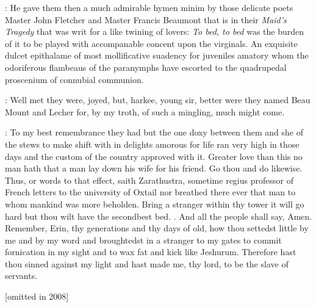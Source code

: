 \documentclass[12pt]{article}
\begin{document}
: He gave them then a much admirable hymen minim by those
delicate poets Master John Fletcher and Master Francis Beaumont that is
in their \emph{Maid's Tragedy} that was writ for a like twining of lovers:
\emph{To bed, to bed} was the burden of it to be played with
accompanable concent upon the virginals.
An exquisite dulcet epithalame of most mollificative suadency for
juveniles amatory whom the odoriferous flambeaus of the paranymphs have
escorted to the quadrupedal proscenium of connubial communion.

\Dx: Well met they were, joyed, but, harkee,
young sir, better were they named Beau Mount and Lecher for, by my troth,
of such a mingling, much might come.

\SD: To my best remembrance they had but the one doxy between them and she
of the stews to make shift with in delights amorous for life ran very high
in those days and the custom of the country approved with it. Greater love
than this no man hath that a man lay down his wife for his friend. Go thou
and do likewise. Thus, or words to that effect, saith Zarathustra,
sometime regius professor of French letters to the university of Oxtail
nor breathed there ever that man to whom mankind was more beholden. Bring
a stranger within thy tower it will go hard but thou wilt have the
secondbest bed. . And all the people
shall say, Amen. Remember, Erin, thy generations and thy days of old, how
thou settedst little by me and by my word and broughtedst in a stranger to
my gates to commit fornication in my sight and to wax fat and kick like
Jeshurum. Therefore hast thou sinned against my light and hast made me,
thy lord, to be the slave of servants.

[omitted in 2008]
\end{document}
